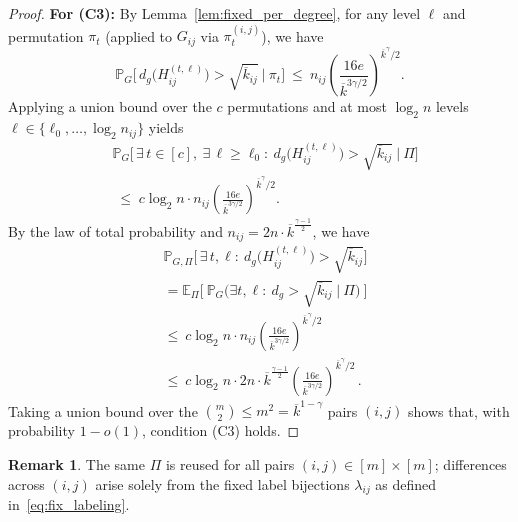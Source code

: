 \documentclass[journal]{IEEEtran}
\theoremstyle{definition}
\newtheorem{remark}{Remark}
\theoremstyle{definition}
\newcommand{\EE}{\mathbb{E}}
\newcommand{\PP}{\mathbb{P}}
\newcommand{\kb}{\overline{k}}
\begin{document}
\begin{proof}
\medskip\noindent
\textbf{For (C3):} By Lemma~\ref{lem:fixed_per_degree}, for any level $\ell$ and permutation $\pi_t$ (applied to $G_{ij}$ via $\pi_t^{(i,j)}$), we have
\[
\PP_{G}\Big[\,d_g\big(H^{(t,\ell)}_{ij}\big)>\sqrt{\kb_{ij}}\ \Big|\ \pi_t\Big]
\ \le\ n_{ij}\left(\frac{16e}{\kb^{3\gamma/2}}\right)^{\kb^{\gamma}/2}.
\]
Applying a union bound over the $c$ permutations and at most $\log_2 n$ levels $\ell\in\{\ell_0,\ldots, \log_2 n_{ij}\}$ yields
\begin{align*}
    &\PP_{G} \Big[\,\exists\,t\in[c],\ \exists\,\ell\ge\ell_0:\ 
       d_g\big(H^{(t,\ell)}_{ij}\big)>\sqrt{\kb_{ij}}\ \Big|\ \Pi\Big] \\
    &\;\le\; c\log_2 n \cdot n_{ij} 
       \left(\frac{16e}{\kb^{3\gamma/2}}\right)^{\kb^{\gamma}/2}.
\end{align*}
By the law of total probability and $n_{ij} = 2n \cdot \kb^{\frac{\gamma-1}{2}}$, we have
\begin{align*}
    &\PP_{G,\Pi} \Big[\,\exists\,t,\ell:\ d_g \big(H^{(t,\ell)}_{ij}\big)>\sqrt{\kb_{ij}}\Big] \\
&=\EE_{\Pi} \Big[\ \PP_{G} \big(\exists t,\ell:\ d_g>\sqrt{\kb_{ij}}\ \big|\ \Pi\big)\ \Big] \\
 &\le\ c\log_2 n \cdot n_{ij} \left(\frac{16e}{\kb^{3\gamma/2}}\right)^{\kb^{\gamma}/2} \\
  &\le\ c\log_2 n \cdot 2n \cdot \kb^{\frac{\gamma-1}{2}} \left(\frac{16e}{\kb^{3\gamma/2}}\right)^{\kb^{\gamma}/2} \, .
\end{align*}
Taking a union bound over the $ \binom{m}{2} \leq m^2 = \kb^{1-\gamma}$ pairs $(i,j)$ shows that, with probability $1-o(1)$, condition (C3) holds.
\end{proof}














\begin{remark}
The same $\Pi$ is reused for all pairs $(i,j)\in[m]\times[m]$; differences across $(i,j)$ arise solely from the fixed label bijections $\lambda_{ij}$ as defined in~\eqref{eq:fix_labeling}.
\end{remark}
\end{document}
